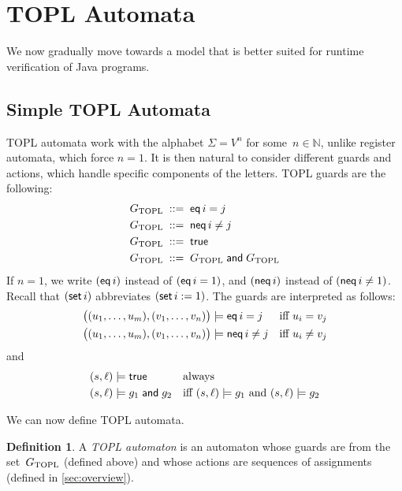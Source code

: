 \documentclass[9pt, preprint]{sigplanconf} %
\newcommand{\N}{\ensuremath{\mathbb{N}}}
\theoremstyle{definition}
\newtheorem{definition}{Definition}
\theoremstyle{remark}
\begin{document}
\section{TOPL Automata}\label{sec:topl_automata} %

We now gradually move towards a model that is better suited for runtime verification of Java programs.

\subsection{Simple TOPL Automata} %

TOPL automata work with the alphabet $\Sigma=V^n$ for some~$n\in\N$, unlike register automata, which force $n=1$.
It is then natural to consider different guards and actions, which handle specific components of the letters.
TOPL guards are the following:
\begin{align*}
G_{\rm TOPL} &\;::=\; {\sf eq}\,i=j \\
G_{\rm TOPL} &\;::=\; {\sf neq}\,i\ne j \\
G_{\rm TOPL} &\;::=\; {\sf true} \\
G_{\rm TOPL} &\;::=\; G_{\rm TOPL} \mathrel{\sf and} G_{\rm TOPL}
\end{align*}
If $n=1$, we write $({\sf eq}\,i)$ instead of $({\sf eq}\,i=1)$, and $({\sf neq}\,i)$ instead of $({\sf neq}\,i\ne1)$.
Recall that $({\sf set}\,i)$ abbreviates $({\sf set}\,i:=1)$.
The guards are interpreted as follows:
\begin{align*}
\bigl((u_1,\ldots,u_m),(v_1,\ldots,v_n)\bigr) &\models {\sf eq}\,i=j
  &&\text{iff $u_i=v_j$} \\
\bigl((u_1,\ldots,u_m),(v_1,\ldots,v_n)\bigr) &\models {\sf neq}\,i\ne j
  &&\text{iff $u_i\ne v_j$}
\end{align*}
and
\begin{align*}
(s,\ell) &\models {\sf true}
  &&\text{always} \\
(s,\ell) &\models g_1\mathrel{\sf and} g_2
  &&\text{iff $(s,\ell)\models g_1$ and $(s,\ell)\models g_2$}
\end{align*}

We can now define TOPL automata.

\begin{definition}
A \emph{TOPL automaton} is an automaton whose guards are from the set~$G_{\rm TOPL}$ (defined above) and whose actions are sequences of assignments (defined in \autoref{sec:overview}).
\end{definition}
\end{document}
